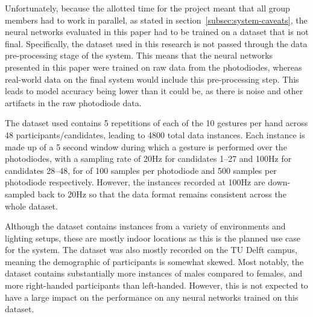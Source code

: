 Unfortunately, because the allotted time for the project meant that all group members had to work in parallel, as stated in section~\ref{subsec:system-caveats}, the neural networks evaluated in this paper had to be trained on a dataset that is not final.
Specifically, the dataset used in this research is not passed through the data pre-processing stage of the system.
This means that the neural networks presented in this paper were trained on raw data from the photodiodes, whereas real-world data on the final system would include this pre-processing step.
This leads to model accuracy being lower than it could be, as there is noise and other artifacts in the raw photodiode data.

The dataset used contains 5 repetitions of each of the 10 gestures per hand across 48 participants/candidates, leading to 4800 total data instances.
Each instance is made up of a 5 second window during which a gesture is performed over the photodiodes, with a sampling rate of 20Hz for candidates 1--27 and 100Hz for candidates 28--48, for of 100 samples per photodiode and 500 samples per photodiode respectively.
However, the instances recorded at 100Hz are down-sampled back to 20Hz so that the data format remains consistent across the whole dataset.

Although the dataset contains instances from a variety of environments and lighting setups, these are mostly indoor locations as this is the planned use case for the system.
The dataset was also mostly recorded on the TU Delft campus, meaning the demographic of participants is somewhat skewed.
Most notably, the dataset contains substantially more instances of males compared to females, and more right-handed participants than left-handed.
However, this is not expected to have a large impact on the performance on any neural networks trained on this dataset.